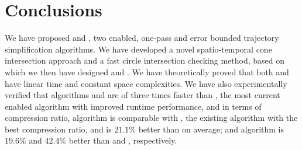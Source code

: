 \section{Conclusions} %

We have proposed \cist and \cista, two \sed enabled, one-pass and error bounded trajectory simplification algorithms.
%
We have developed a novel spatio-temporal cone intersection approach and a fast circle intersection checking method, based on which we then have designed \cist and \cista.
%
We have theoretically proved that both \cist and \cista have linear time and constant space complexities.
%
We have also experimentally verified that algorithms \cist and \cista are of three times faster than \squishe, the most current \sed enabled \lsa algorithm with improved runtime performance,
and in terms of compression ratio, algorithm \cist is {comparable} with \dpa, the existing \lsa algorithm with the best compression ratio, and is $21.1\%$ better than \squishe on average; and algorithm \cista is {$19.6\%$} and {$42.4\%$} better than \dps and \squishe, respectively.
